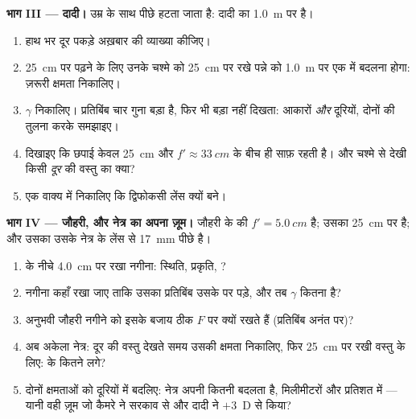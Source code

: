 \begin{problem}
\medskip
\noindent\textbf{भाग III --- दादी।}
उम्र के साथ  पीछे हटता जाता है: दादी का \qty{1.0}{m} पर है।
\begin{enumerate}[resume]
  \item हाथ भर दूर पकड़े अख़बार की व्याख्या कीजिए।
  \item \qty{25}{cm} पर पढ़ने के लिए उनके चश्मे को \qty{25}{cm} पर रखे पन्ने को
        \qty{1.0}{m} पर एक  में बदलना होगा: ज़रूरी
        क्षमता निकालिए।
  \item $\gamma$ निकालिए। प्रतिबिंब चार गुना बड़ा है, फिर भी बड़ा नहीं
        दिखता: आकारों \emph{और} दूरियों, दोनों की तुलना करके समझाइए।
  \item दिखाइए कि छपाई केवल \qty{25}{cm} और $f' \approx \qty{33}{cm}$ के बीच ही साफ़ रहती है।
        और चश्मे से देखी किसी \emph{दूर} की वस्तु का क्या?
  \item एक वाक्य में निकालिए कि द्विफोकसी लेंस क्यों बने।
\end{enumerate}

\medskip
\noindent\textbf{भाग IV --- जौहरी, और नेत्र का अपना ज़ूम।}
जौहरी के  की $f' = \qty{5.0}{cm}$ है; उसका  \qty{25}{cm} पर है;
और उसका  उसके नेत्र के लेंस से \qty{17}{mm} पीछे
है।
\begin{enumerate}[resume]
  \item {} के नीचे \qty{4.0}{cm} पर रखा नगीना: स्थिति, प्रकृति,
        ?
  \item नगीना कहाँ रखा जाए ताकि उसका प्रतिबिंब उसके 
        पर पड़े, और तब $\gamma$ कितना है?
  \item अनुभवी जौहरी नगीने को इसके बजाय ठीक $F$ पर क्यों रखते हैं
        (प्रतिबिंब अनंत पर)?
  \item अब अकेला नेत्र: दूर की वस्तु देखते समय उसकी क्षमता
        निकालिए, फिर \qty{25}{cm} पर रखी वस्तु के लिए:  के
        कितने  लगे?
  \item दोनों क्षमताओं को  दूरियों में बदलिए: नेत्र
        अपनी  कितनी बदलता है, मिलीमीटरों और प्रतिशत
        में --- यानी वही ज़ूम जो कैमरे ने सरकाव से और दादी ने $+3$~D
        से किया?
\end{enumerate}
\end{problem}

